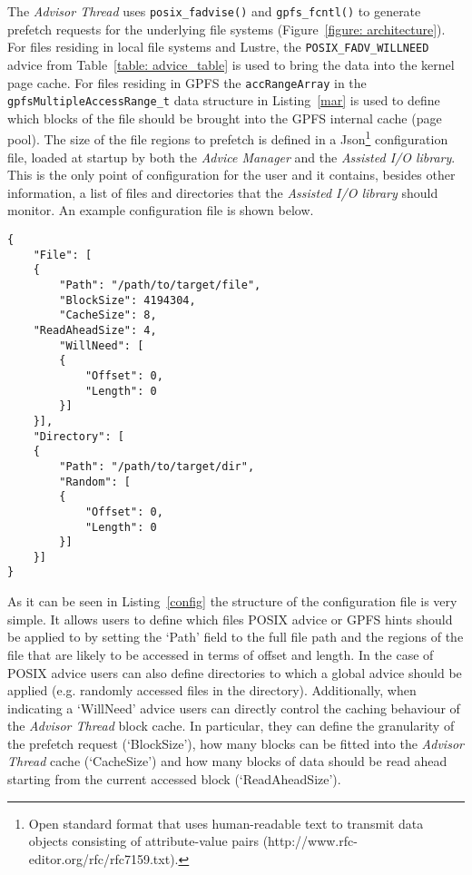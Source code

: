 The \textit{Advisor Thread} uses \texttt{posix\_fadvise()} and \texttt{gpfs\_fcntl()} to generate prefetch requests for the underlying file systems (Figure~\ref{figure: architecture}). For files residing in local file systems and Lustre, the \texttt{POSIX\_FADV\_WILLNEED} advice from Table~\ref{table: advice_table} is used to bring the data into the kernel page cache. For files residing in GPFS the \texttt{accRangeArray} in the \texttt{gpfsMultipleAccessRange\_t} data structure in Listing~\ref{mar} is used to define which blocks of the file should be brought into the GPFS internal cache (page pool). 
The size of the file regions to prefetch is defined in a Json\footnote{Open standard format that uses human-readable text to transmit data objects consisting of attribute-value pairs (http://www.rfc-editor.org/rfc/rfc7159.txt).} configuration file, loaded at startup by both the \textit{Advice Manager} and the \textit{Assisted I/O library}. This is the only point of configuration for the user and it contains, besides other information, a list of files and directories that the \textit{Assisted I/O library} should monitor. An example configuration file is shown below. 
\begin{lstlisting}[frame=single]
{
    "File": [
    {
        "Path": "/path/to/target/file",
        "BlockSize": 4194304,
        "CacheSize": 8,
	"ReadAheadSize": 4,
        "WillNeed": [
        {
            "Offset": 0,
            "Length": 0
        }]
    }],
    "Directory": [
    {
        "Path": "/path/to/target/dir",
        "Random": [
        {
            "Offset": 0,
            "Length": 0
        }]
    }]
}
\end{lstlisting}
As it can be seen in Listing~\ref{config} the structure of the configuration file is very simple. It allows users to define which files POSIX advice or GPFS hints should be applied to by setting the `Path' field to the full file path and the regions of the file that are likely to be accessed in terms of offset and length. In the case of POSIX advice users can also define directories to which a global advice should be applied (e.g. randomly accessed files in the directory). Additionally, when indicating a `WillNeed' advice users can directly control the caching behaviour of the \textit{Advisor Thread} block cache. In particular, they can define the granularity of the prefetch request (`BlockSize'), how many blocks can be fitted into the \textit{Advisor Thread} cache (`CacheSize') and how many blocks of data should be read ahead starting from the current accessed block (`ReadAheadSize'). %
